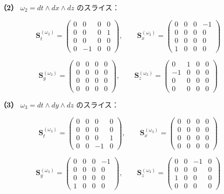 \documentclass[a4paper,12pt,openany]{book}
\begin{document}
\textbf{（2）} \(\omega_2 = dt\wedge dx\wedge dz\) のスライス：

\[
\mathbf{S}_{t}^{(\omega_2)}=\begin{pmatrix}0&0&0&0\\[2pt]0&0&0&1\\[2pt]0&0&0&0\\[2pt]0&-1&0&0\end{pmatrix},\qquad
\mathbf{S}_{x}^{(\omega_2)}=\begin{pmatrix}0&0&0&-1\\[2pt]0&0&0&0\\[2pt]0&0&0&0\\[2pt]1&0&0&0\end{pmatrix}
\]

\[
\mathbf{S}_{y}^{(\omega_2)}=\begin{pmatrix}0&0&0&0\\[2pt]0&0&0&0\\[2pt]0&0&0&0\\[2pt]0&0&0&0\end{pmatrix},\qquad
\mathbf{S}_{z}^{(\omega_2)}=\begin{pmatrix}0&1&0&0\\[2pt]-1&0&0&0\\[2pt]0&0&0&0\\[2pt]0&0&0&0\end{pmatrix}
\]

\textbf{（3）} \(\omega_3 = dt\wedge dy\wedge dz\) のスライス：

\[
\mathbf{S}_{t}^{(\omega_3)}=\begin{pmatrix}0&0&0&0\\[2pt]0&0&0&0\\[2pt]0&0&0&1\\[2pt]0&0&-1&0\end{pmatrix},\qquad
\mathbf{S}_{x}^{(\omega_3)}=\begin{pmatrix}0&0&0&0\\[2pt]0&0&0&0\\[2pt]0&0&0&0\\[2pt]0&0&0&0\end{pmatrix}
\]

\[
\mathbf{S}_{y}^{(\omega_3)}=\begin{pmatrix}0&0&0&-1\\[2pt]0&0&0&0\\[2pt]0&0&0&0\\[2pt]1&0&0&0\end{pmatrix},\qquad
\mathbf{S}_{z}^{(\omega_3)}=\begin{pmatrix}0&0&-1&0\\[2pt]0&0&0&0\\[2pt]1&0&0&0\\[2pt]0&0&0&0\end{pmatrix}
\]
\end{document}
